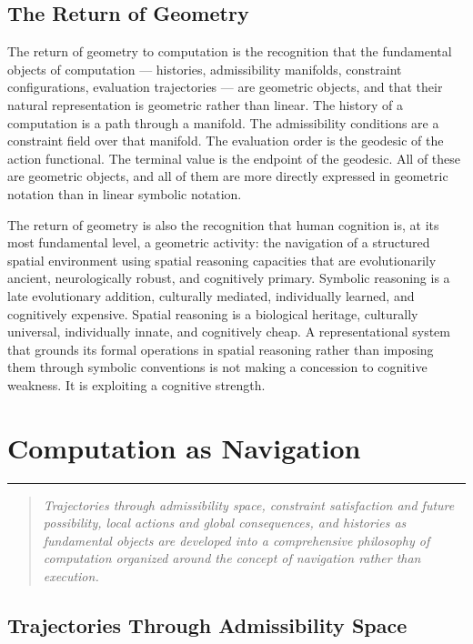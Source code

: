 \documentclass[12pt,openany]{book}
\theoremstyle{plain}
\theoremstyle{definition}
\theoremstyle{remark}
\newcommand{\chapterrule}{%
  \vspace{4pt}%
  {\color{SpherepopBlue}\rule{\textwidth}{0.8pt}}%
  \vspace{10pt}%
}
\newenvironment{chapterprecis}{%
  \begin{quote}\small\itshape}{%
  \end{quote}\medskip}
\begin{document}
\section{The Return of Geometry}

The return of geometry to computation is the recognition that the fundamental objects of computation — histories, admissibility manifolds, constraint configurations, evaluation trajectories — are geometric objects, and that their natural representation is geometric rather than linear. The history of a computation is a path through a manifold. The admissibility conditions are a constraint field over that manifold. The evaluation order is the geodesic of the action functional. The terminal value is the endpoint of the geodesic. All of these are geometric objects, and all of them are more directly expressed in geometric notation than in linear symbolic notation.

The return of geometry is also the recognition that human cognition is, at its most fundamental level, a geometric activity: the navigation of a structured spatial environment using spatial reasoning capacities that are evolutionarily ancient, neurologically robust, and cognitively primary. Symbolic reasoning is a late evolutionary addition, culturally mediated, individually learned, and cognitively expensive. Spatial reasoning is a biological heritage, culturally universal, individually innate, and cognitively cheap. A representational system that grounds its formal operations in spatial reasoning rather than imposing them through symbolic conventions is not making a concession to cognitive weakness. It is exploiting a cognitive strength.

\chapter{Computation as Navigation}
\chapterrule

\begin{chapterprecis}
Trajectories through admissibility space, constraint satisfaction
and future possibility, local actions and global consequences,
and histories as fundamental objects are developed into a
comprehensive philosophy of computation organized around the
concept of navigation rather than execution.
\end{chapterprecis}

\section{Trajectories Through Admissibility Space}
\end{document}
